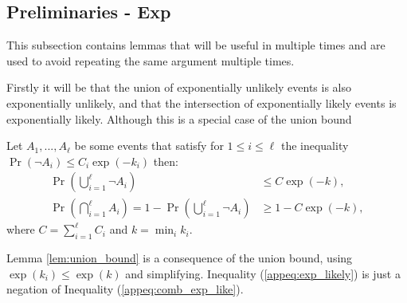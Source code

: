     
    \subsection{Preliminaries - Exp}

        
    
    
    
    
    
    
        This subsection contains lemmas that will be useful in multiple times and are used to avoid repeating the same argument multiple times. 






        Firstly it will be that the union of exponentially unlikely events is also exponentially unlikely, and that the intersection of exponentially likely events is exponentially likely. Although this is a special case of the union bound  
        \begin{lemma} \label{lem:union_bound}
            Let $A_1,...,A_{\ell}$ be some events that satisfy for $1\leq i \leq \ell$ the inequality $\Pr(\lnot A_i) \leq C_i\exp(-k_i)$ then:
            \begin{align}
                \Pr\left(\bigcup_{i=1}^\ell \lnot A_i\right) &\leq C\exp(-k), \label{appeq:comb_exp_like} \\
                \Pr\left(\bigcap_{i=1}^\ell A_i\right) = 1-\Pr\left(\bigcup_{i=1}^\ell \lnot A_i\right) &\geq 1-C\exp(-k), \label{appeq:exp_likely}
            \end{align}
            where $C=\sum_{i=1}^\ell C_i$ and $k = \min_i k_i$.
        \end{lemma}
        \begin{proofoutline}
            Lemma \ref{lem:union_bound} is a consequence of the union bound, using $\exp(k_i)\leq\exp(k)$ and simplifying. Inequality (\ref{appeq:exp_likely}) is just a negation of Inequality (\ref{appeq:comb_exp_like}).
        \end{proofoutline}






